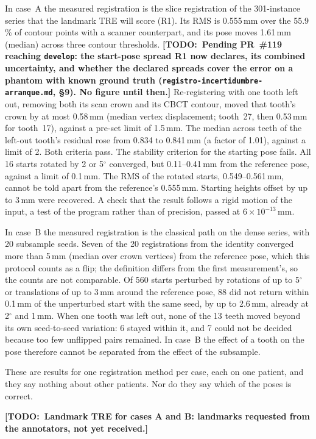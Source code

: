 \documentclass[11pt,a4paper]{article}
\newcommand{\code}[1]{\texttt{\small #1}}
\newif\iffinal \finalfalse
\newcommand{\todo}[1]{\iffinal\errmessage{Unresolved TODO left in the paper}\else
  {\color{red}\bfseries[TODO:~#1]}\fi}
\begin{document}
In case~A the measured registration is the slice registration of the 301-instance series
that the landmark TRE will score (R1). Its RMS is 0.555\,mm over the 55.9\,\% of contour
points with a scanner counterpart, and its pose moves 1.61\,mm (median) across three contour
thresholds. \todo{Pending PR~\#119 reaching \code{develop}: the start-pose spread R1 now
declares, its combined uncertainty, and whether the declared spreads cover the error on a
phantom with known ground truth (\code{registro-incertidumbre-arranque.md}, \S9). No figure
until then.} Re-registering with one tooth left out, removing both its scan crown and its
CBCT contour, moved that tooth's crown by at most 0.58\,mm (median vertex displacement;
tooth~27, then 0.53\,mm for tooth~17), against a pre-set limit of 1.5\,mm. The median across
teeth of the left-out tooth's residual rose from 0.834 to 0.841\,mm (a factor of 1.01),
against a limit of 2. Both criteria pass. The stability criterion for the starting pose
fails. All 16 starts rotated by 2 or 5$^\circ$ converged, but 0.11--0.41\,mm from the
reference pose, against a limit of 0.1\,mm. The RMS of the rotated starts,
0.549--0.561\,mm, cannot be told apart from the reference's 0.555\,mm. Starting heights offset by up to 3\,mm were recovered.
A check that the result follows a rigid motion of the input, a test of the program rather
than of precision, passed at $6\times10^{-13}$\,mm.

In case~B the measured registration is the classical path on the dense series, with 20
subsample seeds. Seven of the 20 registrations from the identity converged more than 5\,mm
(median over crown vertices) from the reference pose, which this protocol counts as a flip;
the definition differs from the first measurement's, so the counts are not comparable. Of
560 starts perturbed by rotations of up to 5$^\circ$ or translations of up to 3\,mm around the
reference pose, 88 did not return within 0.1\,mm of the unperturbed start with the same seed,
by up to 2.6\,mm, already at 2$^\circ$ and 1\,mm. When one tooth was left out, none of the
13 teeth moved beyond its own seed-to-seed variation: 6 stayed within it, and 7 could not be
decided because too few unflipped pairs remained. In
case~B the effect of a tooth on the pose therefore cannot be separated from the effect of
the subsample.

These are results for one registration method per case, each on one patient, and they say
nothing about other patients. Nor do they say which of the poses is correct.
\todo{Landmark TRE for cases A and B: landmarks requested from the annotators, not yet
received.}
\end{document}
